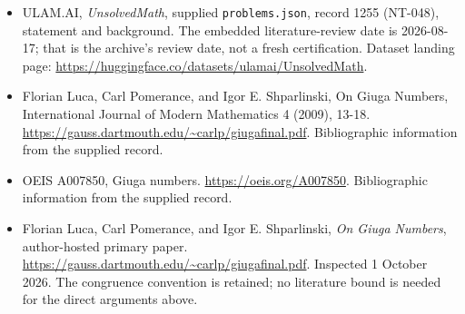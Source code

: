 \documentclass[11pt,a4paper]{article}
\begin{document}
{\small

\begin{itemize}

\item[\hypertarget{source:1255:1}{S1}] ULAM.AI, \emph{UnsolvedMath}, supplied \texttt{problems.json}, record 1255 (NT-048), statement and background. The embedded literature-review date is 2026-08-17; that is the archive’s review date, not a fresh certification. Dataset landing page: \url{https://huggingface.co/datasets/ulamai/UnsolvedMath}.

\item[\hypertarget{source:1255:2}{S2}] Florian Luca, Carl Pomerance, and Igor E. Shparlinski, On Giuga Numbers, International Journal of Modern Mathematics 4 (2009), 13-18. \url{https://gauss.dartmouth.edu/~carlp/giugafinal.pdf}. Bibliographic information from the supplied record.

\item[\hypertarget{source:1255:3}{S3}] OEIS A007850, Giuga numbers. \url{https://oeis.org/A007850}. Bibliographic information from the supplied record.


\item[E1] Florian Luca, Carl Pomerance, and Igor E. Shparlinski,
\emph{On Giuga Numbers}, author-hosted primary paper.
\url{https://gauss.dartmouth.edu/~carlp/giugafinal.pdf}.
Inspected 1 October 2026. The congruence convention is retained; no
literature bound is needed for the direct arguments above.

\end{itemize}

}

\label{end:1255}
\end{document}
